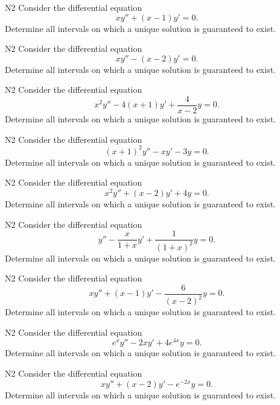 

\begin{problem}{N2}
Consider the differential equation
\[
xy'' + (x-1)y' = 0.
\]
Determine all intervals on which a unique solution is guaranteed to exist.
\end{problem}

\begin{problem}{N2}
Consider the differential equation
\[
xy'' - (x-2)y' = 0.
\]
Determine all intervals on which a unique solution is guaranteed to exist.
\end{problem}

\begin{problem}{N2}
Consider the differential equation
\[
x^2y'' - 4(x+1)y' + \frac{4}{x-2}y = 0.
\]
Determine all intervals on which a unique solution is guaranteed to exist.
\end{problem}

\begin{problem}{N2}
Consider the differential equation
\[
(x+1)^2y'' - xy' - 3y = 0.
\]
Determine all intervals on which a unique solution is guaranteed to exist.
\end{problem}

\begin{problem}{N2}
Consider the differential equation
\[
x^2y'' + (x-2)y' + 4y = 0.
\]
Determine all intervals on which a unique solution is guaranteed to exist.
\end{problem}

\begin{problem}{N2}
Consider the differential equation
\[
y'' - \frac{x}{1+x}y' + \frac{1}{(1+x)^2}y = 0.
\]
Determine all intervals on which a unique solution is guaranteed to exist.
\end{problem}

\begin{problem}{N2}
Consider the differential equation
\[
xy'' + (x-1)y' - \frac{6}{(x-2)^2}y = 0.
\]
Determine all intervals on which a unique solution is guaranteed to exist.
\end{problem}

\begin{problem}{N2}
Consider the differential equation
\[
e^xy'' -2xy' + 4e^{4x}y = 0.
\]
Determine all intervals on which a unique solution is guaranteed to exist.
\end{problem}

\begin{problem}{N2}
Consider the differential equation
\[
xy'' + (x-2)y' - e^{-2x}y = 0.
\]
Determine all intervals on which a unique solution is guaranteed to exist.
\end{problem}

